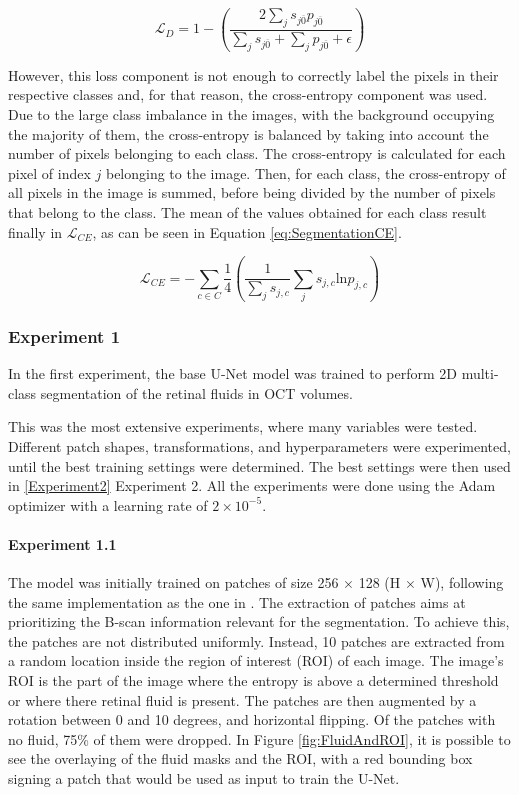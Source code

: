 \begin{equation}
	\mathcal{L}_{D} = 1 - \left( \frac{2 \sum_{j} s_{j\overline{0}} p_{j\overline{0}}}{\sum_{j} s_{j\overline{0}} + \sum_{j} p_{j\overline{0}} + \epsilon} \right)
	\label{eq:SegmentationDice}
\end{equation}

However, this loss component is not enough to correctly label the pixels in their respective classes and, for that reason, the cross-entropy component was used. Due to the large class imbalance in the images, with the background occupying the majority of them, the cross-entropy is balanced by taking into account the number of pixels belonging to each class. The cross-entropy is calculated for each pixel of index $j$ belonging to the image. Then, for each class, the cross-entropy of all pixels in the image is summed, before being divided by the number of pixels that belong to the class. The mean of the values obtained for each class result finally in $\mathcal{L}_{CE}$, as can be seen in Equation \ref{eq:SegmentationCE}.

\begin{equation}
	\mathcal{L}_{CE} = - \sum_{c \in C} \frac{1}{4}\left( \frac{1}{\sum_{j} s_{j,c}} \sum_{j} s_{j,c} \text{ln} p_{j,c} \right)
	\label{eq:SegmentationCE}
\end{equation}

\subsubsection{Experiment 1}\label{Experiment1}
In the first experiment, the base U-Net model was trained to perform 2D multi-class segmentation of the retinal fluids in OCT volumes.
\par
This was the most extensive experiments, where many variables were tested. Different patch shapes, transformations, and hyperparameters were experimented, until the best training settings were determined. The best settings were then used in \ref{Experiment2} Experiment 2. All the experiments were done using the Adam optimizer \parencite{Kingma2017} with a learning rate of $2 \times 10^{-5}$.

\paragraph{Experiment 1.1}
The model was initially trained on patches of size 256 $\times$ 128 (H $\times$ W), following the same implementation as the one in \textcite{Tennakoon2018}. The extraction of patches aims at prioritizing the B-scan information relevant for the segmentation. To achieve this, the patches are not distributed uniformly. Instead, 10 patches are extracted from a random location inside the region of interest (ROI) of each image. The image's ROI is the part of the image where the entropy is above a determined threshold or where there retinal fluid is present. The patches are then augmented by a rotation between 0 and 10 degrees, and horizontal flipping. Of the patches with no fluid, 75\% of them were dropped. In Figure \ref{fig:FluidAndROI}, it is possible to see the overlaying of the fluid masks and the ROI, with a red bounding box signing a patch that would be used as input to train the U-Net.

